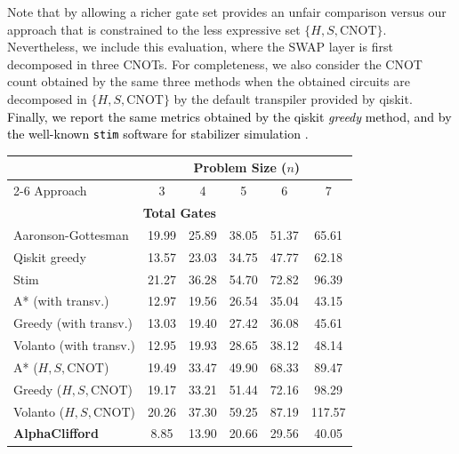 \documentclass[conference]{IEEEtran}
\newcommand{\nt}[1]{\textcolor{black}{#1}}
\begin{document}
  
  Note that by allowing a richer gate set provides an unfair comparison versus our approach that is constrained to the less expressive set $\{H, S, \text{CNOT}\}$. Nevertheless, we include this evaluation, where the SWAP layer is first decomposed in three CNOTs.
  For completeness, we also consider the CNOT count obtained by the same three methods when the obtained circuits are decomposed in $\{H, S, \text{CNOT}\}$ by the default transpiler provided by qiskit. \nt{Finally, we report the same metrics obtained by the qiskit \textit{greedy} method, and by the well-known \texttt{stim} software for stabilizer simulation \cite{stim}.}
\begin{table}[htb]
    \centering
    \begin{tabular}{lccccc}
        \toprule
        & \multicolumn{5}{c}{Problem Size ($n$)} \\
        \cmidrule(lr){2-6}
        Approach & 3 & 4 & 5 & 6 & 7 \\
        \midrule
        \multicolumn{6}{c}{\textbf{Total Gates}} \\
        \midrule
        Aaronson-Gottesman & 19.99 & 25.89 & 38.05 & 51.37 & 65.61 \\
        \textcolor{responsecolour}{Qiskit greedy} & \textcolor{responsecolour}{13.57} & \textcolor{responsecolour}{23.03} & \textcolor{responsecolour}{34.75} & \textcolor{responsecolour}{47.77} & \textcolor{responsecolour}{62.18}\\
        \textcolor{responsecolour}{Stim} & \textcolor{responsecolour}{21.27} & \textcolor{responsecolour}{36.28} & \textcolor{responsecolour}{54.70} & \textcolor{responsecolour}{72.82} & \textcolor{responsecolour}{96.39}\\
        \addlinespace
        A* (with transv.) & 12.97 & 19.56 & 26.54 & 35.04 & 43.15 \\
        Greedy (with transv.) & 13.03 & 19.40 & 27.42 & 36.08 & 45.61 \\
        Volanto (with transv.) & 12.95 & 19.93 & 28.65 & 38.12 & 48.14 \\
        \addlinespace
        A* ($H, S, \text{CNOT}$) & 19.49 & 33.47 & 49.90 & 68.33 & 89.47 \\
        Greedy ($H, S, \text{CNOT}$) & 19.17 & 33.21 & 51.44 & 72.16 & 98.29 \\
        Volanto ($H, S, \text{CNOT}$) & 20.26 & 37.30 & 59.25 & 87.19 & 117.57 \\
        \addlinespace
        \textbf{AlphaClifford} & 8.85 & 13.90 & 20.66 & 29.56 & 40.05 \\

\end{tabular}
\end{table}
\end{document}
